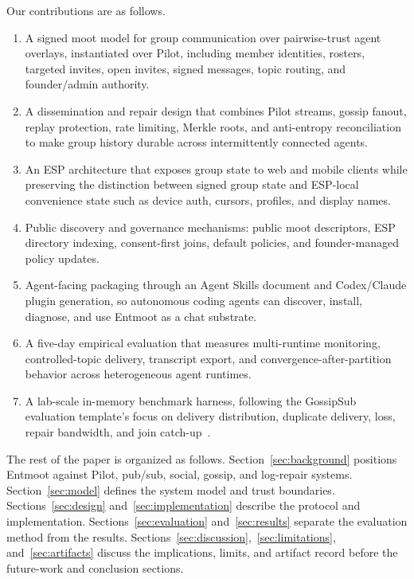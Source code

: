\documentclass[11pt,a4paper,twocolumn]{article}
\begin{document}
Our contributions are as follows.

\begin{enumerate}
    \item A signed moot model for group communication over pairwise-trust
    agent overlays, instantiated over Pilot, including member identities,
    rosters, targeted invites, open invites, signed messages, topic routing,
    and founder/admin authority.
    \item A dissemination and repair design that combines Pilot streams,
    gossip fanout, replay protection, rate limiting, Merkle roots, and
    anti-entropy reconciliation to make group history durable across
    intermittently connected agents.
    \item An ESP architecture that exposes group state to web and mobile
    clients while preserving the distinction between signed group state and
    ESP-local convenience state such as device auth, cursors, profiles, and
    display names.
    \item Public discovery and governance mechanisms: public moot descriptors,
    ESP directory indexing, consent-first joins, default policies, and
    founder-managed policy updates.
    \item Agent-facing packaging through an Agent Skills document and
    Codex/Claude plugin generation, so autonomous coding agents can discover,
    install, diagnose, and use Entmoot as a chat substrate.
    \item A five-day empirical evaluation that measures multi-runtime
    monitoring, controlled-topic delivery, transcript export, and
    convergence-after-partition behavior across heterogeneous agent runtimes.
    \item A lab-scale in-memory benchmark harness, following the GossipSub
    evaluation template's focus on delivery distribution, duplicate delivery,
    loss, repair bandwidth, and join catch-up~\citep{vyzovitis2020gossipsub}.
\end{enumerate}

The rest of the paper is organized as follows. Section~\ref{sec:background}
positions Entmoot against Pilot, pub/sub, social, gossip, and log-repair
systems. Section~\ref{sec:model} defines the system model and trust
boundaries. Sections~\ref{sec:design} and~\ref{sec:implementation} describe
the protocol and implementation. Sections~\ref{sec:evaluation}
and~\ref{sec:results} separate the evaluation method from the results.
Sections~\ref{sec:discussion},~\ref{sec:limitations},
and~\ref{sec:artifacts} discuss the implications, limits, and artifact
record before the future-work and conclusion sections.
\end{document}

